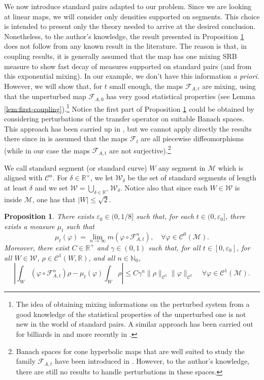 \documentclass{amsart}
\numberwithin{equation}{section}
\newtheorem{proposition}[theorem]{Proposition}
\newcommand\ve{\varepsilon}
\newcommand\vf{\varphi}
\renewcommand{\le}{\leqslant}
\newcommand\cC{{\mathcal C}}
\newcommand\cF{{\mathcal F}}
\newcommand\cM{{\mathcal M}}
\newcommand\cW{{\mathcal W}}
\newcommand\bN{{\mathbb N}}
\newcommand\bR{{\mathbb R}}
\newcommand{\catt}{\cF_{A,t}}
\newcommand{\cato}{\cF_{A,0}}
\begin{document}
We now introduce standard pairs adapted to our problem. Since we are looking at linear maps, we will consider only densities supported on segments. This choice is intended to present only the theory needed to arrive at the desired conclusion. Nonetheless, to the author's knowledge, the result presented in Proposition \ref{prop:fundamental-example} does not follow from any known result in the literature. The reason is that, in coupling results, it is generally assumed that the map has one mixing SRB measure to show fast decay of measures supported on standard pairs (and from this exponential mixing). In our example, we don't have this information \textit{a priori}. However, we will show that, for \(t\) small enough, the maps \(\catt\) are mixing, using that the unperturbed map \(\cato\) has very good statistical properties (see Lemma \ref{lem:first-coupling}).\footnote{The idea of obtaining mixing informations on the perturbed system from a good knowledge of the statistical properties of the unperturbed one is not new in the world of standard pairs. A similar approach has been carried out for billiards in \cite{CD09} and more recently in \cite{DL23}.} Notice the first part of Proposition \ref{prop:fundamental-example} could be obtained by considering perturbations of the transfer operator on suitable Banach spaces. This approach has been carried up in \cite{DL08}, but we cannot apply directly the results there since in \cite{DL08} is assumed that the maps \(\cF_t\) are all piecewise diffeomorphisms (while in our case the maps \(\catt\) are not surjective).\footnote{Banach spaces for cone hyperbolic maps that are well suited to study the family \(\catt\) have been introduced in \cite{BG09, BG10}. However, to the author's knowledge, there are still no results to handle perturbations in these spaces.}

We call standard segment (or standard curve) \(W\) any segment in \(\cM\) which is aligned with \(\mathscr C^u\).  For \(\delta \in \bR^+\), we let \(\cW_{\delta}\) be the set of standard segments of length at least \(\delta\) and we set \(\cW = \bigcup_{\delta \in \bR^+}\cW_{\delta}\). Notice also that since each \(W \in \cW\) is inside \(\cM\), one has that \(|W| \le \sqrt{2}\).
\begin{proposition}\label{prop:fundamental-example}
There exists \(\ve_0 \in (0, 1/8]\) such that, for each \(t \in (0, \ve_0]\), there exists a measure \(\mu_t\) such that
\[
     \mu_{t}(\vf) = \lim_{n \to \infty}m\left( \vf \circ \catt^n \right), \quad \forall \vf \in \cC^0(\cM).
\]
Moreover, there exist \(C \in \bR^+\) and \(\gamma \in (0,1)\) such that, for all \(t \in [0,\ve_0]\), for all \(W \in \cW\), \(\rho \in \cC^1(W, \bR)\), and all \(n \in \bN_0\),
\[
       \left|\int_{W} \left(\vf \circ \catt^n\right) \rho - \mu_t(\vf)\int_{W} \rho \right| \le C \gamma^n \|\rho\|_{\cC^1}\|\vf\|_{\cC^1}\quad \forall \vf \in \cC^1(\cM).
\]
\end{proposition}
\end{document}
